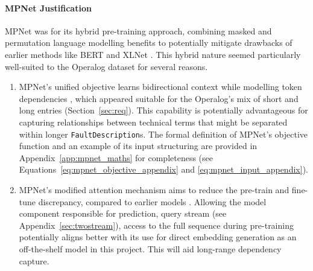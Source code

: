 \documentclass[10pt,oneside]{report}
\begin{document}
\paragraph{MPNet Justification}
MPNet \cite{song2020mpnet} was for its hybrid pre-training approach, combining masked and permutation language modelling benefits to potentially mitigate drawbacks of earlier methods like BERT \cite{devlin2019bert} and XLNet \cite{yang2019xlnet}. This hybrid nature seemed particularly well-suited to the Operalog dataset for several reasons.

\begin{enumerate}
    \item MPNet's unified objective learns bidirectional context while modelling token dependencies \cite{song2020mpnet}, which appeared suitable for the Operalog's mix of short and long entries (Section~\ref{sec:req}). This capability is potentially advantageous for capturing relationships between technical terms that might be separated within longer \texttt{FaultDescription}s. The formal definition of MPNet's objective function and an example of its input structuring are provided in Appendix~\ref{app:mpnet_maths} for completeness (see Equations~\ref{eq:mpnet_objective_appendix} and \ref{eq:mpnet_input_appendix}). 

    \item MPNet's modified attention mechanism aims to reduce the pre-train and fine-tune discrepancy, compared to earlier models \cite{song2020mpnet}. Allowing the model component responsible for prediction, query stream (see Appendix~\ref{sec:twostream}), access to the full sequence during pre-training potentially aligns better with its use for direct embedding generation as an off-the-shelf model in this project. This will aid long-range dependency capture.



\end{enumerate}
\end{document}
